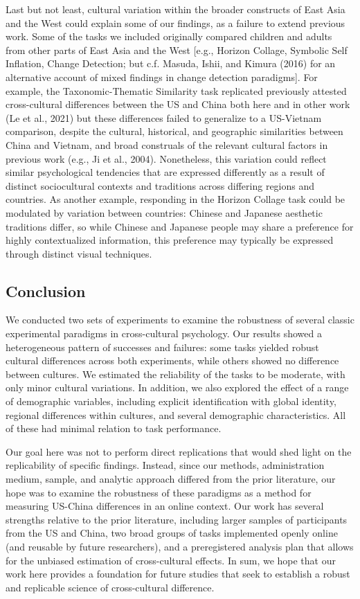 \documentclass[
  man,floatsintext]{apa6}
\begin{document}
Last but not least, cultural variation within the broader constructs of East Asia and the West could explain some of our findings, as a failure to extend previous work. Some of the tasks we included originally compared children and adults from other parts of East Asia and the West {[}e.g., Horizon Collage, Symbolic Self Inflation, Change Detection; but c.f. Masuda, Ishii, and Kimura (2016) for an alternative account of mixed findings in change detection paradigms{]}. For example, the Taxonomic-Thematic Similarity task replicated previously attested cross-cultural differences between the US and China both here and in other work (Le et al., 2021) but these differences failed to generalize to a US-Vietnam comparison, despite the cultural, historical, and geographic similarities between China and Vietnam, and broad construals of the relevant cultural factors in previous work (e.g., Ji et al., 2004). Nonetheless, this variation could reflect similar psychological tendencies that are expressed differently as a result of distinct sociocultural contexts and traditions across differing regions and countries. As another example, responding in the Horizon Collage task could be modulated by variation between countries: Chinese and Japanese aesthetic traditions differ, so while Chinese and Japanese people may share a preference for highly contextualized information, this preference may typically be expressed through distinct visual techniques.

\hypertarget{conclusion}{%
\subsection{Conclusion}\label{conclusion}}

We conducted two sets of experiments to examine the robustness of several classic experimental paradigms in cross-cultural psychology. Our results showed a heterogeneous pattern of successes and failures: some tasks yielded robust cultural differences across both experiments, while others showed no difference between cultures. We estimated the reliability of the tasks to be moderate, with only minor cultural variations. In addition, we also explored the effect of a range of demographic variables, including explicit identification with global identity, regional differences within cultures, and several demographic characteristics. All of these had minimal relation to task performance.

Our goal here was not to perform direct replications that would shed light on the replicability of specific findings. Instead, since our methods, administration medium, sample, and analytic approach differed from the prior literature, our hope was to examine the robustness of these paradigms as a method for measuring US-China differences in an online context. Our work has several strengths relative to the prior literature, including larger samples of participants from the US and China, two broad groups of tasks implemented openly online (and reusable by future researchers), and a preregistered analysis plan that allows for the unbiased estimation of cross-cultural effects. In sum, we hope that our work here provides a foundation for future studies that seek to establish a robust and replicable science of cross-cultural difference.
\end{document}
